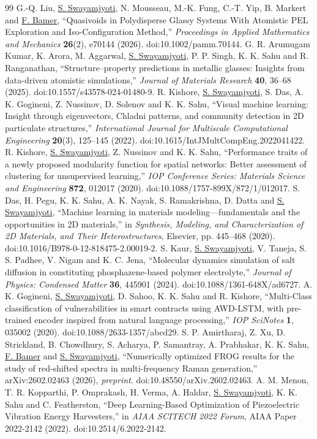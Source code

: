 \documentclass[11pt,a4paper]{article}
\begin{document}
\begin{thebibliography}{99}
 G.-Q. Liu, \underline{S. Swayamjyoti}, N. Mousseau, M.-K. Fung, C.-T. Yip, B. Markert and \underline{F. Bamer}, ``Quasivoids in Polydisperse Glassy Systems With Atomistic PEL Exploration and Iso-Configuration Method,'' \emph{Proceedings in Applied Mathematics and Mechanics} \textbf{26}(2), e70144 (2026). doi:10.1002/pamm.70144.
 G. R. Arumugam Kumar, K. Arora, M. Aggarwal, \underline{S. Swayamjyoti}, P. P. Singh, K. K. Sahu and R. Ranganathan, ``Structure--property predictions in metallic glasses: Insights from data-driven atomistic simulations,'' \emph{Journal of Materials Research} \textbf{40}, 36--68 (2025). doi:10.1557/s43578-024-01480-9.
 R. Kishore, \underline{S. Swayamjyoti}, S. Das, A. K. Gogineni, Z. Nussinov, D. Solenov and K. K. Sahu, ``Visual machine learning: Insight through eigenvectors, Chladni patterns, and community detection in 2D particulate structures,'' \emph{International Journal for Multiscale Computational Engineering} \textbf{20}(3), 125--145 (2022). doi:10.1615/IntJMultCompEng.2022041422.
 R. Kishore, \underline{S. Swayamjyoti}, Z. Nussinov and K. K. Sahu, ``Performance traits of a newly proposed modularity function for spatial networks: Better assessment of clustering for unsupervised learning,'' \emph{IOP Conference Series: Materials Science and Engineering} \textbf{872}, 012017 (2020). doi:10.1088/1757-899X/872/1/012017.
 S. Das, H. Pegu, K. K. Sahu, A. K. Nayak, S. Ramakrishna, D. Datta and \underline{S. Swayamjyoti}, ``Machine learning in materials modeling---fundamentals and the opportunities in 2D materials,'' in \emph{Synthesis, Modeling, and Characterization of 2D Materials, and Their Heterostructures}, Elsevier, pp. 445--468 (2020). doi:10.1016/B978-0-12-818475-2.00019-2.
 S. Kaur, \underline{S. Swayamjyoti}, V. Taneja, S. S. Padhee, V. Nigam and K. C. Jena, ``Molecular dynamics simulation of salt diffusion in constituting phosphazene-based polymer electrolyte,'' \emph{Journal of Physics: Condensed Matter} \textbf{36}, 445901 (2024). doi:10.1088/1361-648X/ad6727.
 A. K. Gogineni, \underline{S. Swayamjyoti}, D. Sahoo, K. K. Sahu and R. Kishore, ``Multi-Class classification of vulnerabilities in smart contracts using AWD-LSTM, with pre-trained encoder inspired from natural language processing,'' \emph{IOP SciNotes} \textbf{1}, 035002 (2020). doi:10.1088/2633-1357/abcd29.
 S. P. Amirtharaj, Z. Xu, D. Strickland, B. Chowdhury, S. Acharya, P. Samantray, A. Prabhakar, K. K. Sahu, \underline{F. Bamer} and \underline{S. Swayamjyoti}, ``Numerically optimized FROG results for the study of red-shifted spectra in multi-frequency Raman generation,'' arXiv:2602.02463 (2026), \emph{preprint}. doi:10.48550/arXiv.2602.02463.
 A. M. Menon, T. R. Kopparthi, P. Omprakash, H. Verma, A. Haldar, \underline{S. Swayamjyoti}, K. K. Sahu and C. Featherston, ``Deep Learning-Based Optimization of Piezoelectric Vibration Energy Harvesters,'' in \emph{AIAA SCITECH 2022 Forum}, AIAA Paper 2022-2142 (2022). doi:10.2514/6.2022-2142.
\end{thebibliography}
\end{document}
